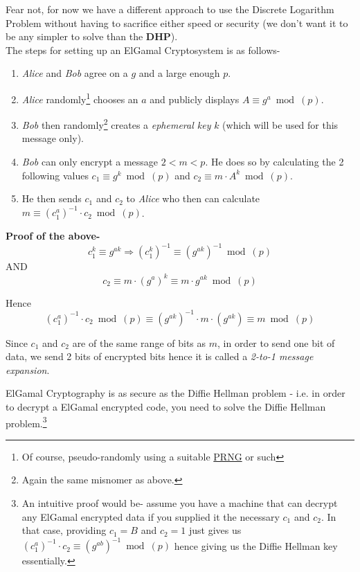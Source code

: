 		Fear not, for now we have a different approach to use the Discrete Logarithm Problem without having to sacrifice either speed or security (we don't want it to be any simpler to solve than the \textbf{DHP}).\\
		The steps for setting up an ElGamal Cryptosystem is as follows-
		\begin{enumerate}
			\item \emph{Alice} and \emph{Bob} agree on a \(g\) and a large enough \(p\).
			\item \emph{Alice} randomly\footnote{Of course, pseudo-randomly using a suitable \hyperref[subsec:prng]{PRNG} or such} chooses an \(a\) and publicly displays \(A \equiv g^a \bmod(p)\).
			\item \emph{Bob} then randomly\footnote{Again the same misnomer as above.} creates a \emph{ephemeral key} \(k\) (which will be used for this message only). 
			\item \emph{Bob} can only encrypt a message \(2< m < p\). He does so by calculating the 2 following values \(c_1 \equiv g^k \bmod(p)\) and \(c_2 \equiv m \cdot  A^k \bmod(p)\).
			\item He then sends \(c_1\) and \(c_2\) to \emph{Alice} who then can calculate \(m \equiv (c_1^a)^{-1} \cdot c_2 \bmod(p)\).
		\end{enumerate}

		\begin{mdframed}
			\centering \textbf{Proof of the above-}
			\[c_1^k \equiv g^{ak} \Rightarrow (c_1^k)^{-1} \equiv (g^{ak})^{-1} \bmod(p)\]
			\centering
				AND
			\[c_2 \equiv m \cdot (g^a)^k \equiv m \cdot g^{ak} \bmod(p)\]
			\raggedright Hence
			\[(c_1^a)^{-1} \cdot c_2 \bmod(p) \equiv (g^{ak})^{-1} \cdot m \cdot (g^{ak}) \equiv m \bmod(p)\]
		\end{mdframed}

		\begin{tcolorbox}[breakable, colback=blue!5!white,colframe=blue!75!black]
			Since \(c_1\) and \(c_2\) are of the same range of bits as \(m\), in order to send one bit of data, we send 2 bits of encrypted bits hence it is called a \emph{2-to-1 message expansion}.
		\end{tcolorbox}

		ElGamal Cryptography is as secure as the Diffie Hellman problem - i.e. in order to decrypt a ElGamal encrypted code, you need to solve the Diffie Hellman problem.\footnote{An intuitive proof would be- assume you have a machine that can decrypt any ElGamal encrypted data if you supplied it the necessary \(c_1\) and \(c_2\). In that case, providing \(c_1 = B\) and \(c_2 = 1\) just gives us \((c_1^a)^{-1}\cdot c_2 \equiv (g^{ab})^{-1} \bmod(p)\) hence giving us the Diffie Hellman key essentially.}

